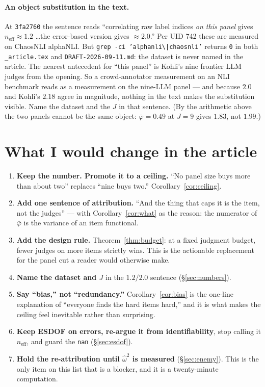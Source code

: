 \documentclass[11pt]{article}
\theoremstyle{plain}
\theoremstyle{definition}
\theoremstyle{remark}
\newcommand{\pb}{\bar{\varphi}}
\newcommand{\neff}{n_{\mathrm{eff}}}
\begin{document}
\paragraph{An object substitution in the text.} At \texttt{3fa2760} the sentence reads
``correlating raw label indices \emph{on this panel} gives $\neff\approx1.2$ \dots the error-based
version gives $\approx2.0$.'' Per UID 742 these are measured on ChaosNLI alphaNLI. But
\texttt{grep -ci 'alphanli\textbackslash|chaosnli'} returns \texttt{0} in both
\texttt{\_article.tex} and \texttt{DRAFT-2026-09-11.md}: the dataset is never named in the
article. The nearest antecedent for ``this panel'' is Kohli's nine frontier LLM judges from the
opening. So a crowd-annotator measurement on an NLI benchmark reads as a measurement on the
nine-LLM panel --- and because $2.0$ and Kohli's $2.18$ agree in magnitude, nothing in the text
makes the substitution visible. Name the dataset and the $J$ in that sentence. (By the arithmetic
above the two panels cannot be the same object: $\pb=0.49$ at $J=9$ gives $1.83$, not $1.99$.)

\section{What I would change in the article}

\begin{enumerate}
\item \textbf{Keep the number. Promote it to a ceiling.} ``No panel size buys more than about
two'' replaces ``nine buys two.'' Corollary~\ref{cor:ceiling}.
\item \textbf{Add one sentence of attribution.} ``And the thing that caps it is the item, not the
judges'' --- with Corollary~\ref{cor:what} as the reason: the numerator of $\pb$ is the variance
of an item functional.
\item \textbf{Add the design rule.} Theorem~\ref{thm:budget}: at a fixed judgment budget, fewer
judges on more items strictly wins. This is the actionable replacement for the panel cut a reader
would otherwise make.
\item \textbf{Name the dataset and $J$} in the $1.2/2.0$ sentence (\S\ref{sec:numbers}).
\item \textbf{Say ``bias,'' not ``redundancy.''} Corollary~\ref{cor:bias} is the one-line
explanation of ``everyone finds the hard items hard,'' and it is what makes the ceiling feel
inevitable rather than surprising.
\item \textbf{Keep ESDOF on errors, re-argue it from identifiability}, stop calling it
$\neff$, and guard the \texttt{nan} (\S\ref{sec:esdof}).
\item \textbf{Hold the re-attribution until $\hat\omega^2$ is measured} (\S\ref{sec:enemy}). This
is the only item on this list that is a blocker, and it is a twenty-minute computation.
\end{enumerate}
\end{document}
